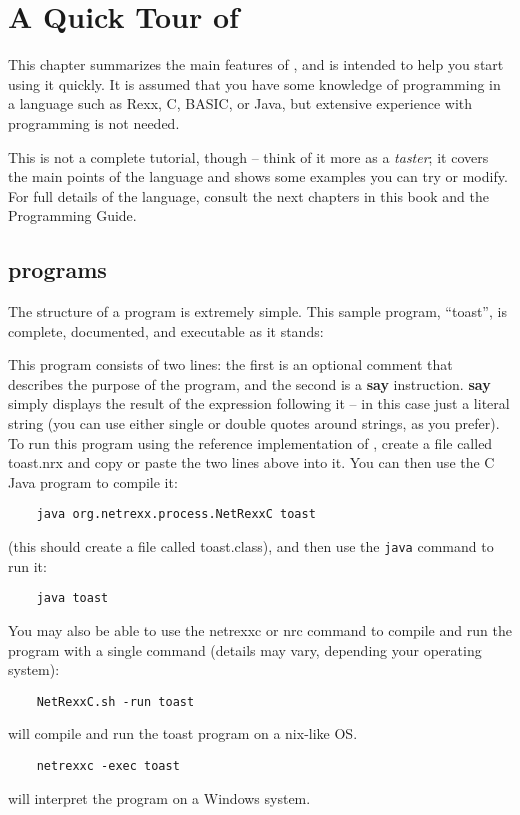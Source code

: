 \chapter{A Quick Tour of \nr{}}
This chapter summarizes the main features of \nr{}, and is intended
to help you start using it quickly. It is assumed that you have some
knowledge of programming in a language such as Rexx, C, BASIC, or
Java, but extensive experience with programming is not needed.

This is not a complete tutorial, though – think of it more as a
\emph{taster}; it covers the main points of the language and shows some
examples you can try or modify. For full details of the language,
consult the next chapters in this book and the \nr{} Programming Guide.


\section{\nr{} programs}
The structure of a \nr{} program is extremely simple. This sample
program, “toast”, is complete, documented, and executable as it
stands:

This program consists of two lines: the first is an optional comment that describes the purpose of the program, and
the second is a \textbf{say} instruction. \textbf{say} simply displays the result of the expression following it – in this case just a literal string (you can use either single or double quotes around strings, as you prefer).
To run this program using the reference implementation of \nr{},
create a file called toast.nrx and copy or paste the two lines above
into it. You can then use the \nr{}C Java program to compile it:
\begin{lstlisting}
    java org.netrexx.process.NetRexxC toast
\end{lstlisting}
(this should create a file called toast.class), and then use
the \texttt{java} command to run it:
\begin{lstlisting}
    java toast
\end{lstlisting}
You may also be able to use the netrexxc or nrc command to compile and
run the program with a single command (details may vary, depending your
operating system):
\begin{lstlisting}
    NetRexxC.sh -run toast
\end{lstlisting}
will compile and run the toast program on a \*nix-like OS.
\begin{lstlisting}
    netrexxc -exec toast
\end{lstlisting}
will interpret the program on a Windows system.

